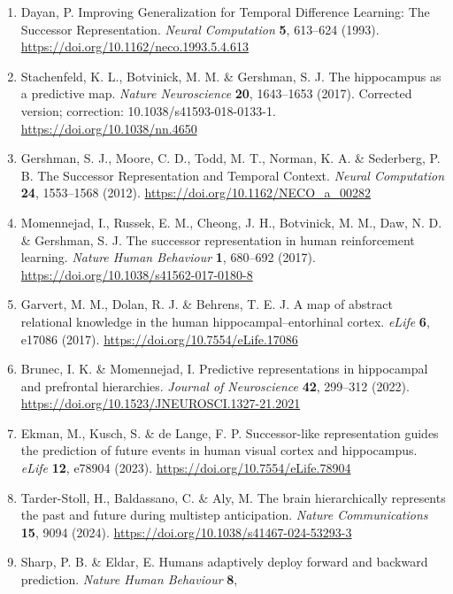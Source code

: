\documentclass[11pt,a4paper]{article}
\begin{document}
\fontsize{9}{11}\selectfont
\setlength{\parskip}{2pt}

\begin{enumerate}
\def\labelenumi{\arabic{enumi}.}
\item
  Dayan, P. Improving Generalization for Temporal Difference Learning:
  The Successor Representation. \emph{Neural Computation} \textbf{5},
  613–624 (1993). \url{https://doi.org/10.1162/neco.1993.5.4.613}
\item
  Stachenfeld, K. L., Botvinick, M. M. \& Gershman, S. J. The
  hippocampus as a predictive map. \emph{Nature Neuroscience}
  \textbf{20}, 1643–1653 (2017). Corrected version; correction:
  10.1038/s41593-018-0133-1. \url{https://doi.org/10.1038/nn.4650}
\item
  Gershman, S. J., Moore, C. D., Todd, M. T., Norman, K. A. \&
  Sederberg, P. B. The Successor Representation and Temporal Context.
  \emph{Neural Computation} \textbf{24}, 1553–1568 (2012).
  \url{https://doi.org/10.1162/NECO_a_00282}
\item
  Momennejad, I., Russek, E. M., Cheong, J. H., Botvinick, M. M., Daw,
  N. D. \& Gershman, S. J. The successor representation in human
  reinforcement learning. \emph{Nature Human Behaviour} \textbf{1},
  680–692 (2017). \url{https://doi.org/10.1038/s41562-017-0180-8}
\item
  Garvert, M. M., Dolan, R. J. \& Behrens, T. E. J. A map of abstract
  relational knowledge in the human hippocampal–entorhinal cortex.
  \emph{eLife} \textbf{6}, e17086 (2017).
  \url{https://doi.org/10.7554/eLife.17086}
\item
  Brunec, I. K. \& Momennejad, I. Predictive representations in
  hippocampal and prefrontal hierarchies. \emph{Journal of Neuroscience}
  \textbf{42}, 299–312 (2022).
  \url{https://doi.org/10.1523/JNEUROSCI.1327-21.2021}
\item
  Ekman, M., Kusch, S. \& de Lange, F. P. Successor-like representation
  guides the prediction of future events in human visual cortex and
  hippocampus. \emph{eLife} \textbf{12}, e78904 (2023).
  \url{https://doi.org/10.7554/eLife.78904}
\item
  Tarder-Stoll, H., Baldassano, C. \& Aly, M. The brain hierarchically
  represents the past and future during multistep anticipation.
  \emph{Nature Communications} \textbf{15}, 9094 (2024).
  \url{https://doi.org/10.1038/s41467-024-53293-3}
\item
  Sharp, P. B. \& Eldar, E. Humans adaptively deploy forward and
  backward prediction. \emph{Nature Human Behaviour} \textbf{8},

\end{enumerate}
\end{document}

